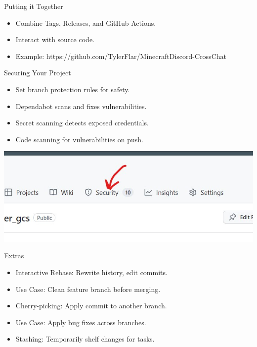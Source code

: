 \documentclass[aspectratio=169]{beamer}
\begin{document}
\begin{frame}{Putting it Together}
    \begin{itemize}
        \item Combine Tags, Releases, and GitHub Actions.
        \item Interact with source code.
        \item Example: https://github.com/TylerFlar/MinecraftDiscord-CrossChat
    \end{itemize}
\end{frame}
\begin{frame}{Securing Your Project}
    \begin{itemize}
        \item Set branch protection rules for safety.
        \item Dependabot scans and fixes vulnerabilities.
        \item Secret scanning detects exposed credentials.
        \item Code scanning for vulnerabilities on push.
    \end{itemize}
    \begin{center}
        \includegraphics[scale=.5]{github_security.jpg}
    \end{center}
\end{frame}
\begin{frame}{Extras}
    \begin{itemize}
        \item Interactive Rebase: Rewrite history, edit commits.
        \item Use Case: Clean feature branch before merging.
        \item Cherry-picking: Apply commit to another branch.
        \item Use Case: Apply bug fixes across branches.
        \item Stashing: Temporarily shelf changes for tasks.
    \end{itemize}
    \end{frame}
\end{document}
